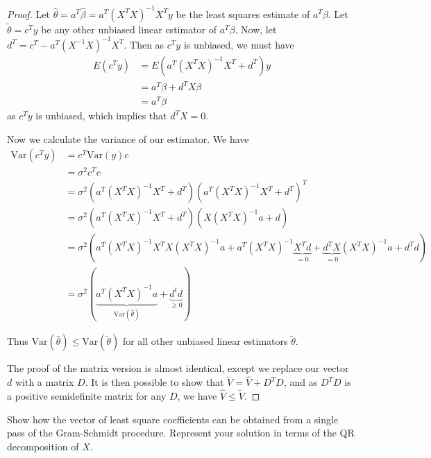 \begin{proof}
    Let $\hat \theta = a^T \hat \beta = a^T(X^TX)^{-1}X^T y$ be the least squares estimate of $a^T \beta$.  Let $\tilde \theta = c^T y$ be any other unbiased linear estimator of $a^T \beta$.  Now, let $d^T = c^T - a^T(X^{-1}X)^{-1}X^T$.  Then as $c^T y$ is unbiased, we must have \begin{align*}
        E(c^T y) &= E\left( a^T(X^{T}X)^{-1}X^T + d^T\right) y \\
                &= a^T\beta + d^T X\beta \\
                &= a^T\beta
    \end{align*} as $c^T y$ is unbiased, which implies that $d^T X = 0$.

    Now we calculate the variance of our estimator.  We have \begin{align*}
        \text{Var}(c^T y) &= c^T \text{Var}(y) c \\
                    &= \sigma^2 c^T c \\
                    &= \sigma^2 \left( a^T(X^{T}X)^{-1}X^T + d^T \right) \left( a^T (X^T X)^{-1} X^T + d^T \right)^T \\
                    &= \sigma^2 \left( a^T (X^T X)^{-1}X^T + d^T\right) \left(X (X^{T}X)^{-1}a + d\right) \\
                    &= \sigma^2 \left( a^T (X^TX)^{-1}X^T X(X^T X)^{-1} a + a^T (X^T X)^{-1} \underbrace{X^T d}_{=0} + \underbrace{d^T X}_{=0}(X^T X)^{-1} a + d^T d \right) \\
                    &= \sigma^2 \left(\underbrace{a^T (X^T X)^{-1} a}_{\text{Var}(\hat \theta)} + \underbrace{d^t d}_{\geq 0} \right)
    \end{align*}

    Thus $\text{Var}(\hat \theta) \leq \text{Var}(\tilde \theta)$ for all other unbiased linear estimators $\tilde \theta$.

    The proof of the matrix version is almost identical, except we replace our vector $d$ with a matrix $D$.  It is then possible to show that $\tilde V = \hat V + D^T D$, and as $D^T D$ is a positive semidefinite matrix for any $D$, we have $\hat V \leq \tilde V$. 
\end{proof}

\begin{exer}
    Show how the vector of least square coefficients can be obtained from a single pass of the Gram-Schmidt procedure.  Represent your solution in terms of the QR decomposition of $X$.  
\end{exer}

